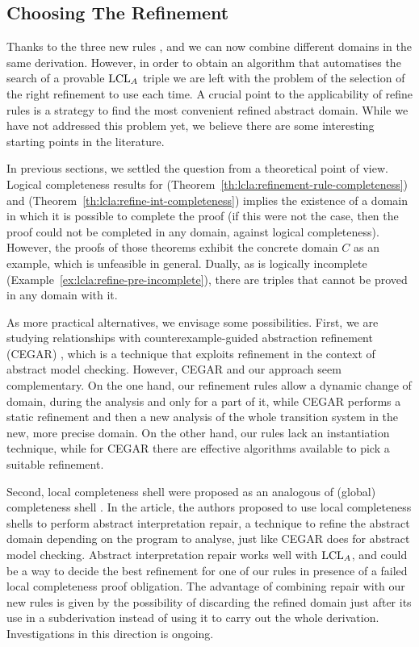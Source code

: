 \subsection{Choosing The Refinement}\label{sec:lcla:choose-refinement}
Thanks to the three new rules ,  and  we can now combine different domains in the same derivation.
However, in order to obtain an algorithm that automatises the search of a provable $\text{LCL}_A$ triple we are left with the problem of the selection of the right refinement to use each time. A crucial point to the applicability of refine rules is a strategy to find the most convenient refined abstract domain. While we have not addressed this problem yet, we believe there are some interesting starting points in the literature.

In previous sections, we settled the question from a theoretical point of view. Logical completeness results for  (Theorem~\ref{th:lcla:refinement-rule-completeness}) and  (Theorem~\ref{th:lcla:refine-int-completeness}) implies the existence of a domain in which it is possible to complete the proof (if this were not the case, then the proof could not be completed in any domain, against logical completeness). However, the proofs of those theorems exhibit the concrete domain $C$ as an example, which is unfeasible in general. Dually, as  is logically incomplete (Example~\ref{ex:lcla:refine-pre-incomplete}), there are triples that cannot be proved in any domain with it.

As more practical alternatives, we envisage some possibilities.
First, we are studying relationships with counterexample\hyp{}guided abstraction refinement (CEGAR) \cite{CGJLV00}, which is a technique that exploits refinement in the context of abstract model checking. However, CEGAR and our approach seem complementary. On the one hand, our refinement rules allow a dynamic change of domain, during the analysis and only for a part of it, while CEGAR performs a static refinement and then a new analysis of the whole transition system in the new, more precise domain. On the other hand, our rules lack an instantiation technique, while for CEGAR there are effective algorithms available to pick a suitable refinement.

Second, local completeness shell \cite{BGGR22} were proposed as an analogous of (global) completeness shell \cite{GRS00}. In the article, the authors proposed to use local completeness shells to perform abstract interpretation repair, a technique to refine the abstract domain depending on the program to analyse, just like CEGAR does for abstract model checking. Abstract interpretation repair works well with $\text{LCL}_A$, and could be a way to decide the best refinement for one of our rules in presence of a failed local completeness proof obligation. The advantage of combining repair with our new rules is given by the possibility of discarding the refined domain just after its use in a subderivation instead of using it to carry out the whole derivation. Investigations in this direction is ongoing.

